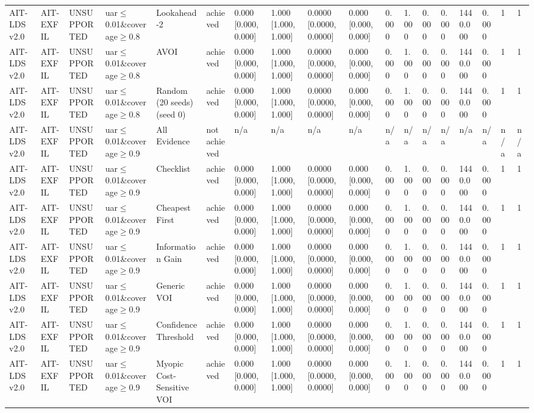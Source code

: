 \begin{table}[!ht]
{\begin{tabular}{llllllllllllllllll}
AIT-LDS v2.0 & AIT-EXFIL & UNSUPPORTED & uar$\le$0.01\&coverage$\ge$0.8 & Lookahead-2 & achieved & 0.000 [0.000, 0.000] & 1.000 [1.000, 1.000] & 0.0000 [0.0000, 0.0000] & 0.000 [0.000, 0.000] & 0.000 & 1.000 & 0.000 & 0.000 & 1440.000 & 0.000 & 1 & 1 \\
AIT-LDS v2.0 & AIT-EXFIL & UNSUPPORTED & uar$\le$0.01\&coverage$\ge$0.8 & AVOI & achieved & 0.000 [0.000, 0.000] & 1.000 [1.000, 1.000] & 0.0000 [0.0000, 0.0000] & 0.000 [0.000, 0.000] & 0.000 & 1.000 & 0.000 & 0.000 & 1440.000 & 0.000 & 1 & 1 \\
AIT-LDS v2.0 & AIT-EXFIL & UNSUPPORTED & uar$\le$0.01\&coverage$\ge$0.8 & Random (20 seeds) (seed 0) & achieved & 0.000 [0.000, 0.000] & 1.000 [1.000, 1.000] & 0.0000 [0.0000, 0.0000] & 0.000 [0.000, 0.000] & 0.000 & 1.000 & 0.000 & 0.000 & 1440.000 & 0.000 & 1 & 1 \\
AIT-LDS v2.0 & AIT-EXFIL & UNSUPPORTED & uar$\le$0.01\&coverage$\ge$0.9 & All Evidence & not achieved & n/a & n/a & n/a & n/a & n/a & n/a & n/a & n/a & n/a & n/a & n/a & n/a \\
AIT-LDS v2.0 & AIT-EXFIL & UNSUPPORTED & uar$\le$0.01\&coverage$\ge$0.9 & Checklist & achieved & 0.000 [0.000, 0.000] & 1.000 [1.000, 1.000] & 0.0000 [0.0000, 0.0000] & 0.000 [0.000, 0.000] & 0.000 & 1.000 & 0.000 & 0.000 & 1440.000 & 0.000 & 1 & 1 \\
AIT-LDS v2.0 & AIT-EXFIL & UNSUPPORTED & uar$\le$0.01\&coverage$\ge$0.9 & Cheapest First & achieved & 0.000 [0.000, 0.000] & 1.000 [1.000, 1.000] & 0.0000 [0.0000, 0.0000] & 0.000 [0.000, 0.000] & 0.000 & 1.000 & 0.000 & 0.000 & 1440.000 & 0.000 & 1 & 1 \\
AIT-LDS v2.0 & AIT-EXFIL & UNSUPPORTED & uar$\le$0.01\&coverage$\ge$0.9 & Information Gain & achieved & 0.000 [0.000, 0.000] & 1.000 [1.000, 1.000] & 0.0000 [0.0000, 0.0000] & 0.000 [0.000, 0.000] & 0.000 & 1.000 & 0.000 & 0.000 & 1440.000 & 0.000 & 1 & 1 \\
AIT-LDS v2.0 & AIT-EXFIL & UNSUPPORTED & uar$\le$0.01\&coverage$\ge$0.9 & Generic VOI & achieved & 0.000 [0.000, 0.000] & 1.000 [1.000, 1.000] & 0.0000 [0.0000, 0.0000] & 0.000 [0.000, 0.000] & 0.000 & 1.000 & 0.000 & 0.000 & 1440.000 & 0.000 & 1 & 1 \\
AIT-LDS v2.0 & AIT-EXFIL & UNSUPPORTED & uar$\le$0.01\&coverage$\ge$0.9 & Confidence Threshold & achieved & 0.000 [0.000, 0.000] & 1.000 [1.000, 1.000] & 0.0000 [0.0000, 0.0000] & 0.000 [0.000, 0.000] & 0.000 & 1.000 & 0.000 & 0.000 & 1440.000 & 0.000 & 1 & 1 \\
AIT-LDS v2.0 & AIT-EXFIL & UNSUPPORTED & uar$\le$0.01\&coverage$\ge$0.9 & Myopic Cost-Sensitive VOI & achieved & 0.000 [0.000, 0.000] & 1.000 [1.000, 1.000] & 0.0000 [0.0000, 0.0000] & 0.000 [0.000, 0.000] & 0.000 & 1.000 & 0.000 & 0.000 & 1440.000 & 0.000 & 1 & 1 \\

\end{tabular}}
\end{table}
